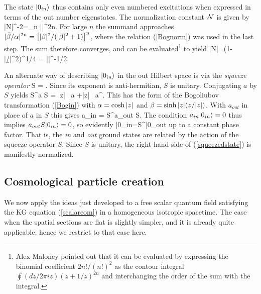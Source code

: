 \documentclass[12pt]{article}
\begin{document}
The state $|0_{in}\rangle$ thus contains only even numbered excitations when 
expressed in terms of the out number eigenstates. 
The normalization constant ${\cal N}$ is given by 
%
\beq
|{\cal N}|^{-2}=\sum_n \left|\frac{\bar{\b}}{2\a}\right|^{2n}.
\eeq
%
For large $n$ the summand approaches $|\bar{\beta}/\alpha|^{2n}=\left[|\beta|^2/(|\beta|^2+1)\right]^n$, 
where the relation (\ref{Bognorm}) was used in the last step.
The sum therefore converges, and can be 
evaluated\footnote{Alex Maloney pointed out that it
can be evaluated by expressing the binomial coefficient $2n!/(n!)^2$
as the contour integral $\oint(dz/2\pi i z)(z+1/z)^{2n}$ and interchanging
the order of the sum with the integral.} to yield 
%
\beq
|{\cal N}|=\Bigl(1-|\b/\a|^2\Bigr)^{1/4} = |\a|^{-1/2}.
\label{N1mode}
\eeq
%

An alternate way of describing $|0_{in}\rangle$ in the out Hilbert space
is via the {\it squeeze operator}
%
\beq
S = \exp{}.
\label{squeezeop}
\eeq
%
Since its exponent is anti-hermitian, $S$ is unitary.
Conjugating $a$ by $S$ yields 
%
\beq
S^\dagger a S = \cosh |z| \, a +\sinh |z|  \, a^\dagger.
\eeq
%
This has the form of the Bogoliubov transformation
(\ref{Bogin}) with $\alpha=\cosh|z|$ and $\beta=\sinh |z|({z}/{|z|})$.
With $a_{out}$ in place of $a$ in $S$ this gives
%
\beq
a_{in} = S^\dagger a_{out} S.
\eeq
%
The condition $a_{in}|0_{in}\rangle=0$ thus implies
$a_{out} S|0_{in}\rangle=0$, so evidently
%
\beq
|0_{in}\ra=S^\dagger |0_{out}\ra
\label{squeezedstate}
\eeq
%
up to a constant phase factor.
That is, the {\it in} and {\it out} ground states 
are related by the action of the
squeeze operator $S$. Since $S$ is 
unitary, the right hand side of (\ref{squeezedstate})
is manifestly normalized.

\subsection{Cosmological particle creation}

We now apply the ideas just developed to a free 
scalar quantum field satisfying the KG equation
(\ref{scalareom}) 
in a homogeneous isotropic spacetime. The case when the spatial 
sections are flat is slightly simpler, and it is already
quite applicable, hence we restrict to that case
here.  
\end{document}
